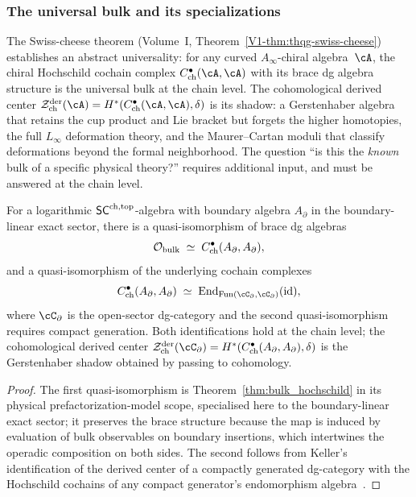 \subsubsection{The universal bulk and its specializations}
\label{subsec:universal-bulk-specializations}

The Swiss-cheese theorem
(Volume~I, Theorem~\ref*{V1-thm:thqg-swiss-cheese})
establishes an abstract universality: for any curved
$A_\infty$-chiral algebra~$\cA$, the chiral Hochschild cochain
complex $C^\bullet_{\mathrm{ch}}(\cA, \cA)$ with its brace dg
algebra structure is the universal bulk at the chain level. The
cohomological derived center
$\cZ^{\mathrm{der}}_{\mathrm{ch}}(\cA)
= H^*(C^\bullet_{\mathrm{ch}}(\cA, \cA), \delta)$
is its shadow: a Gerstenhaber algebra that retains the cup product
and Lie bracket but forgets the higher homotopies, the full
$L_\infty$ deformation theory, and the Maurer--Cartan moduli
that classify deformations beyond the formal neighborhood.
The question ``is this the \emph{known}
bulk of a specific physical theory?'' requires additional input,
and must be answered at the chain level.

\begin{proposition}
\label{prop:bulk-specialization-boundary-linear}
For a logarithmic $\mathsf{SC}^{\mathrm{ch},\mathrm{top}}$-algebra with boundary algebra
$A_\partial$ in the boundary-linear exact sector, there is a
quasi-isomorphism of brace dg algebras
\[
 \mathcal{O}_{\mathrm{bulk}}
 \;\simeq\;
 C^\bullet_{\mathrm{ch}}(A_\partial, A_\partial),
\]
and a quasi-isomorphism of the underlying cochain complexes
\[
 C^\bullet_{\mathrm{ch}}(A_\partial, A_\partial)
 \;\simeq\;
 \End_{\operatorname{Fun}(\cC_\partial,\cC_\partial)}(\id),
\]
where $\cC_\partial$ is the open-sector dg-category and the
second quasi-isomorphism requires compact generation. Both
identifications hold at the chain level\textup{;} the
cohomological derived center
$\cZ^{\mathrm{der}}_{\mathrm{ch}}(\cC_\partial)
= H^*(C^\bullet_{\mathrm{ch}}(A_\partial, A_\partial), \delta)$
is the Gerstenhaber shadow obtained by passing to cohomology.
\end{proposition}

\begin{proof}
The first quasi-isomorphism is
Theorem~\ref{thm:bulk_hochschild} in its physical
prefactorization-model scope, specialised here to the boundary-linear
exact sector; it preserves the brace structure because the map is
induced by evaluation of bulk observables on boundary insertions,
which intertwines the operadic composition on both sides. The second
follows from
Keller's identification of the derived center of a compactly
generated dg-category with the Hochschild cochains of any compact
generator's endomorphism algebra~\cite{Kel06}.
\end{proof}

